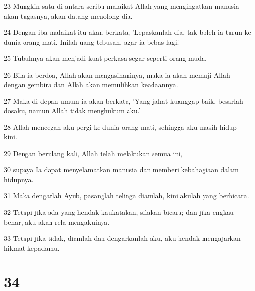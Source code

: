 \par 23 Mungkin satu di antara seribu malaikat Allah yang mengingatkan manusia akan tugasnya, akan datang menolong dia.
\par 24 Dengan iba malaikat itu akan berkata, 'Lepaskanlah dia, tak boleh ia turun ke dunia orang mati. Inilah uang tebusan, agar ia bebas lagi.'
\par 25 Tubuhnya akan menjadi kuat perkasa segar seperti orang muda.
\par 26 Bila ia berdoa, Allah akan mengasihaninya, maka ia akan memuji Allah dengan gembira dan Allah akan memulihkan keadaannya.
\par 27 Maka di depan umum ia akan berkata, 'Yang jahat kuanggap baik, besarlah dosaku, namun Allah tidak menghukum aku.'
\par 28 Allah mencegah aku pergi ke dunia orang mati, sehingga aku masih hidup kini.
\par 29 Dengan berulang kali, Allah telah melakukan semua ini,
\par 30 supaya Ia dapat menyelamatkan manusia dan memberi kebahagiaan dalam hidupnya.
\par 31 Maka dengarlah Ayub, pasanglah telinga diamlah, kini akulah yang berbicara.
\par 32 Tetapi jika ada yang hendak kaukatakan, silakan bicara; dan jika engkau benar, aku akan rela mengakuinya.
\par 33 Tetapi jika tidak, diamlah dan dengarkanlah aku, aku hendak mengajarkan hikmat kepadamu.

\chapter{34}

